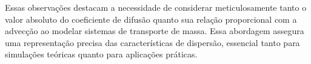 Essas observações destacam a necessidade de considerar meticulosamente tanto o valor absoluto do coeficiente de difusão quanto sua relação proporcional com a advecção ao modelar sistemas de transporte de massa. Essa abordagem assegura uma representação precisa das características de dispersão, essencial tanto para simulações teóricas quanto para aplicações práticas.
